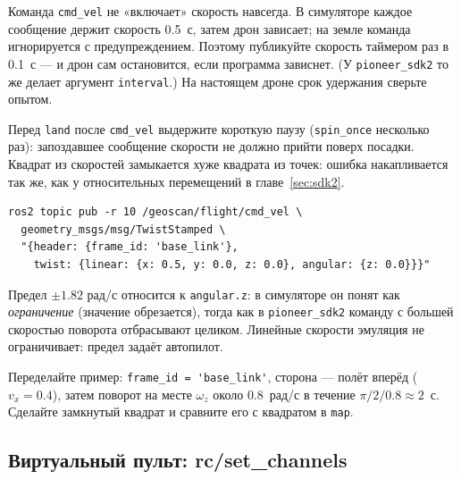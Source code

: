 \begin{rulebox}
Команда \verb|cmd_vel| не «включает» скорость навсегда. В симуляторе каждое сообщение держит скорость 0.5~с, затем дрон зависает; на земле команда игнорируется с предупреждением. Поэтому публикуйте скорость таймером раз в 0.1~с --- и дрон сам остановится, если программа зависнет. (У \texttt{pioneer\_sdk2} то же делает аргумент \verb|interval|.) На настоящем дроне срок удержания сверьте опытом.
\end{rulebox}

Перед \verb|land| после \verb|cmd_vel| выдержите короткую паузу (\verb|spin_once| несколько раз): запоздавшее сообщение скорости не должно прийти поверх посадки. Квадрат из скоростей замыкается хуже квадрата из точек: ошибка накапливается так же, как у относительных перемещений в главе~\ref{sec:sdk2}.

\begin{codebox}
\small
\begin{verbatim}
ros2 topic pub -r 10 /geoscan/flight/cmd_vel \
  geometry_msgs/msg/TwistStamped \
  "{header: {frame_id: 'base_link'},
    twist: {linear: {x: 0.5, y: 0.0, z: 0.0}, angular: {z: 0.0}}}"
\end{verbatim}
\end{codebox}

\begin{infobox}
Предел $\pm 1.82$ рад/с относится к \verb|angular.z|: в симуляторе он понят как \emph{ограничение} (значение обрезается), тогда как в \texttt{pioneer\_sdk2} команду с большей скоростью поворота отбрасывают целиком. Линейные скорости эмуляция не ограничивает: предел задаёт автопилот.
\end{infobox}

\begin{taskbox}
Переделайте пример: \verb|frame_id = 'base_link'|, сторона --- полёт вперёд ($v_x = 0.4$), затем поворот на месте $\omega_z$ около $0.8$~рад/с в течение $\pi/2 / 0.8 \approx 2$~с. Сделайте замкнутый квадрат и сравните его с квадратом в \verb|map|.
\mission{Мини~2 SDK2}{47, 48}
\end{taskbox}

\subsection{Виртуальный пульт: rc/set\_channels}

